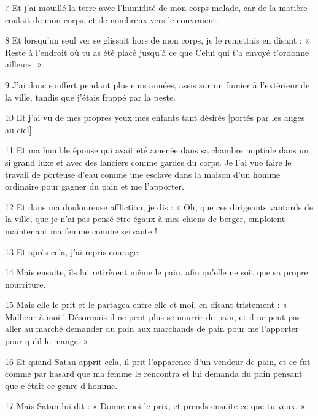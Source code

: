 \par 7 Et j'ai mouillé la terre avec l'humidité de mon corps malade, car de la matière coulait de mon corps, et de nombreux vers le couvraient.

\par 8 Et lorsqu'un seul ver se glissait hors de mon corps, je le remettais en disant : « Reste à l'endroit où tu as été placé jusqu'à ce que Celui qui t'a envoyé t'ordonne ailleurs. »

\par 9 J'ai donc souffert pendant plusieurs années, assis sur un fumier à l'extérieur de la ville, tandis que j'étais frappé par la peste.

\par 10 Et j'ai vu de mes propres yeux mes enfants tant désirés [portés par les anges au ciel]

\par 11 Et ma humble épouse qui avait été amenée dans sa chambre nuptiale dans un si grand luxe et avec des lanciers comme gardes du corps. Je l'ai vue faire le travail de porteuse d'eau comme une esclave dans la maison d'un homme ordinaire pour gagner du pain et me l'apporter.

\par 12 Et dans ma douloureuse affliction, je dis : « Oh, que ces dirigeants vantards de la ville, que je n'ai pas pensé être égaux à mes chiens de berger, emploient maintenant ma femme comme servante !

\par 13 Et après cela, j'ai repris courage.

\par 14 Mais ensuite, ils lui retirèrent même le pain, afin qu'elle ne soit que sa propre nourriture.

\par 15 Mais elle le prit et le partagea entre elle et moi, en disant tristement : « Malheur à moi ! Désormais il ne peut plus se nourrir de pain, et il ne peut pas aller au marché demander du pain aux marchands de pain pour me l'apporter pour qu'il le mange. »

\par 16 Et quand Satan apprit cela, il prit l'apparence d'un vendeur de pain, et ce fut comme par hasard que ma femme le rencontra et lui demanda du pain pensant que c'était ce genre d'homme.

\par 17 Mais Satan lui dit : « Donne-moi le prix, et prends ensuite ce que tu veux. »

